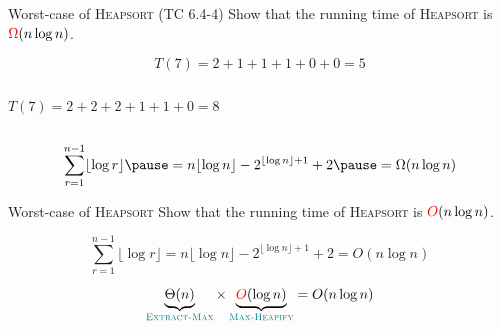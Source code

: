 \begin{frame}{}
  \begin{exampleblock}{Worst-case of \textsc{Heapsort} (TC 6.4-4)}
    Show that the  running time of \textsc{Heapsort} is $\textcolor{red}{\Omega}(n \log n)$.
  \end{exampleblock}

  \vspace{0.30cm}
\end{frame}

\begin{frame}{}
  \begin{center}
    {}
  \end{center}


  \pause
  \vspace{-0.30cm}
  \[
    T(7) = 2 + 1 + 1 + 1 + 0 + 0 = 5
  \]

\end{frame}

\begin{frame}{}
  \begin{columns}
      \pause
      \[
        T(7) = 2 + 2 + 2 + 1 + 1 + 0 = 8
      \]
      \pause 
      \begin{center}
        {\footnotesize {}}
      \end{center}
      \pause
  \end{columns}

  \pause
  \vspace{0.60cm}
  \[
    \sum_{r=1}^{n-1} \lfloor \log r \rfloor \pause = n \lfloor \log  n \rfloor - 2^{\lfloor \log n \rfloor + 1} + 2 \pause = \Omega(n \log n)
  \]
\end{frame}

\begin{frame}{}
  \begin{exampleblock}{Worst-case of \textsc{Heapsort}}
    Show that the  running time of \textsc{Heapsort} is $\textcolor{red}{O}(n \log n)$.
  \end{exampleblock}

  \pause
  \[
    \sum_{r=1}^{n-1} \lfloor \log r \rfloor = n \lfloor \log  n \rfloor - 2^{\lfloor \log n \rfloor + 1} + 2 = O(n \log n)
  \]

  \pause
  \vspace{0.30cm}
  \centerline{}

  \pause
  \vspace{0.30cm}
  \[
    \underbrace{\Theta(n)}_{\textcolor{teal}{\textsc{Extract-Max}}} \times \underbrace{\textcolor{red}{O}(\log n)}_{\textcolor{teal}{\textsc{Max-Heapify}}} = O(n \log n)
  \]
\end{frame}


